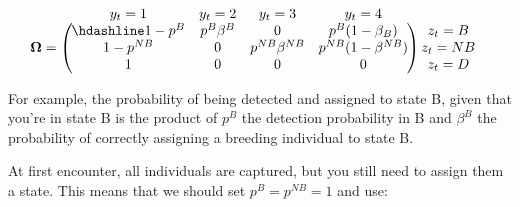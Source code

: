 \documentclass[
  12pt,
]{krantz}
\begin{document}
\[\begin{matrix}
& \\
\mathbf{\Omega} =
    \left ( \vphantom{ \begin{matrix} 12 \\ 12 \\ 12\end{matrix} } \right .
\end{matrix}
\hspace{-1.2em}
\begin{matrix}
    y_t=1 & y_t=2 & y_t=3 & y_t=4\\ \hdashline
1 - p^B & p^B \beta^B & 0 & p^B (1-\beta_ B) \\
1-p^{NB} & 0 & p^{NB} \beta^{NB} & p^{NB} (1-\beta^{NB})\\
1 & 0 & 0 & 0
\end{matrix}
\hspace{-0.2em}
\begin{matrix}
& \\
\left . \vphantom{ \begin{matrix} 12 \\ 12 \\ 12\end{matrix} } \right )
    \begin{matrix}
    z_{t}=B \\ z_{t}=NB \\ z_{t}=D
    \end{matrix}
\end{matrix}\]

For example, the probability of being detected and assigned to state B, given that you're in state B is the product of \(p^B\) the detection probability in B and \(\beta^B\) the probability of correctly assigning a breeding individual to state B.

At first encounter, all individuals are captured, but you still need to assign them a state. This means that we should set \(p^B = p^{NB} = 1\) and use:
\end{document}
